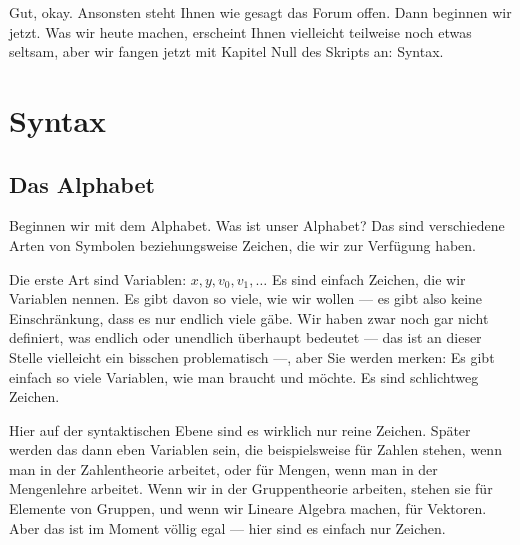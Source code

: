 \begin{spoken-clean}[00:24:44 - 00:26:01]
Gut, okay. Ansonsten steht Ihnen wie gesagt das Forum offen. Dann beginnen wir jetzt.  Was wir heute machen, erscheint Ihnen vielleicht teilweise noch etwas seltsam, aber wir fangen jetzt mit Kapitel Null des Skripts an: Syntax.
\end{spoken-clean}

\section{Syntax}

\subsection{Das Alphabet}

\begin{spoken-clean}[00:26:01 - 00:28:38]
Beginnen wir mit dem Alphabet.  Was ist unser Alphabet? Das sind verschiedene Arten von Symbolen beziehungsweise Zeichen, die wir zur Verfügung haben.

Die erste Art sind Variablen: $x, y, v_0, v_1, \dots$ Es sind einfach Zeichen, die wir Variablen nennen. Es gibt davon so viele, wie wir wollen --- es gibt also keine Einschränkung, dass es nur endlich viele gäbe. Wir haben zwar noch gar nicht definiert, was endlich oder unendlich überhaupt bedeutet --- das ist an dieser Stelle vielleicht ein bisschen problematisch ---, aber Sie werden merken: Es gibt einfach so viele Variablen, wie man braucht und möchte. Es sind schlichtweg Zeichen.

Hier auf der syntaktischen Ebene sind es wirklich nur reine Zeichen. Später werden das dann eben Variablen sein, die beispielsweise für Zahlen stehen, wenn man in der Zahlentheorie arbeitet, oder für Mengen, wenn man in der Mengenlehre arbeitet. Wenn wir in der Gruppentheorie arbeiten, stehen sie für Elemente von Gruppen, und wenn wir Lineare Algebra machen, für Vektoren. Aber das ist im Moment völlig egal --- hier sind es einfach nur Zeichen.
\end{spoken-clean}

